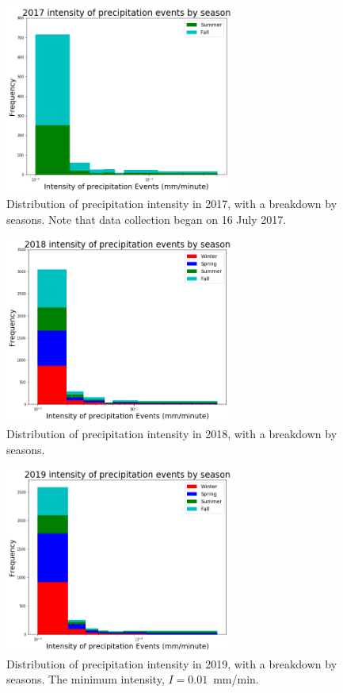 \documentclass[11pt]{report}
\begin{document}
\clearpage
\begin{figure}[t]
	\centering
	\includegraphics[width=0.675\textwidth]{Figures/inten2017.png}
	\caption[Intensity histogram for 2017 broken down by season]
	{\label{i2017}Distribution of precipitation intensity in 2017,
		with a breakdown by seasons. Note that data collection began on 16
		July 2017.}
\end{figure}
\begin{figure}[b]
	\centering
	\includegraphics[width=0.675\textwidth]{Figures/inten2018.png}
	\caption[Intensity histogram for 2018 broken down by season]
	{\label{i2018}Distribution of precipitation intensity in 2018,
		with a breakdown by seasons.}
\end{figure}
\clearpage
\begin{figure}[t]
	\centering
	\includegraphics[width=0.675\textwidth]{Figures/inten2019.png}
	\caption[Intensity histogram for 2019 broken down by season]
	{\label{i2019}Distribution of precipitation intensity in
		2019, with a breakdown by seasons. The minimum intensity,
		$I=0.01$~mm/min. 
	}
\end{figure}
\end{document}
